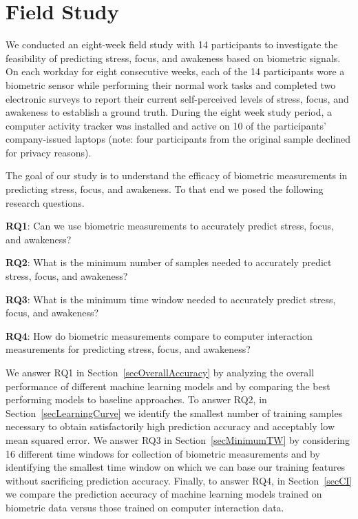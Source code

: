 \section{Field Study}
We conducted an eight-week field study with 14 participants to investigate the feasibility of predicting stress, focus, and awakeness based on biometric signals. On each workday for eight consecutive weeks, each of the 14 participants wore a biometric sensor while performing their normal work tasks and completed two electronic surveys to report their current self-perceived levels of stress, focus, and awakeness to establish a ground truth. During the eight week study period, a computer activity tracker was installed and active on 10 of the participants' company-issued laptops (note: four participants from the original sample declined for privacy reasons).

The goal of our study is to understand the efficacy of biometric measurements in predicting stress, focus, and awakeness. To that end we posed the following research questions.

\vspace{0.5em}
\noindent\textbf{RQ1}: Can we use biometric measurements to accurately predict stress,
focus, and awakeness? 

\vspace{0.5em}
\noindent\textbf{RQ2}: What is the minimum number of samples needed to accurately predict stress, focus, and awakeness? 

\vspace{0.5em}
\noindent\textbf{RQ3}: What is the minimum time window needed to accurately predict stress, focus, and awakeness? 

\vspace{0.5em}
\noindent\textbf{RQ4}: How do biometric measurements compare to computer interaction measurements for predicting stress, focus, and awakeness?

\vspace{0.5em}

We answer RQ1 in Section~\ref{secOverallAccuracy} by analyzing the overall performance of different
machine learning models and by comparing the best performing models to baseline approaches.
To answer RQ2, in Section~\ref{secLearningCurve} we identify the smallest number of training samples necessary to obtain satisfactorily high prediction accuracy and acceptably low mean squared error.
We answer RQ3 in Section~\ref{secMinimumTW} by considering 16 different time windows for collection of biometric measurements and by identifying the smallest time window on which we can base our training features without sacrificing prediction accuracy.
Finally, to answer RQ4, in Section~\ref{secCI} we compare the prediction accuracy of machine learning models trained on biometric data versus those trained on computer interaction data.


